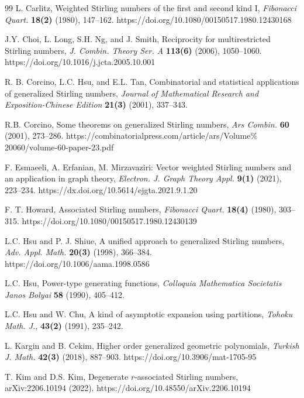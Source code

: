 \documentclass[12pt, reqno]{amsart}
\newtheorem{proof 1}{proof 1}
\begin{document}
\begin{thebibliography}{99}
 L. Carlitz, Weighted {S}tirling numbers of the first and second kind I, \textit{Fibonacci Quart.} \textbf{18(2)} (1980), 147--162. https://doi.org/10.1080/00150517.1980.12430168

 J.Y. Choi, L. Long, S.H. Ng, and J. Smith, Reciprocity for multirestricted Stirling numbers, \textit{J. Combin. Theory Ser. A} \textbf{113(6)} (2006), 1050--1060. https://doi.org/10.1016/j.jcta.2005.10.001

  R. B. Corcino, L.C. Hsu, and E.L. Tan, Combinatorial and statistical applications of generalized Stirling numbers, \textit{Journal of Mathematical Research and Exposition-Chinese Edition} \textbf{21(3)} (2001), 337--343. 
 
  R.B. Corcino, Some theorems on generalized Stirling numbers, \textit{Ars Combin.} \textbf{60} (2001), 273--286. https://combinatorialpress.com/article/ars/Volume$\%$20060/volume-60-paper-23.pdf

 F. Esmaeeli, A. Erfanian, M. Mirzavaziri: Vector weighted Stirling numbers and an application in graph theory, \textit{Electron. J. Graph Theory Appl.} \textbf{9(1)} (2021), 223--234. https://dx.doi.org/10.5614/ejgta.2021.9.1.20

  F. T. Howard, Associated Stirling numbers, \textit{Fibonacci Quart.} \textbf{18(4)}  (1980), 303--315. https://doi.org/10.1080/00150517.1980.12430139
 
  L.C. Hsu and P. J. Shiue, A unified approach to generalized Stirling numbers, \textit{Adv. Appl. Math.} \textbf{20(3)} (1998), 366--384.  https://doi.org/10.1006/aama.1998.0586
 
  L.C. Hsu,  Power-type generating functions,  \textit{Colloquia Mathematica Societatis Janos Bolyai} \textbf{58} (1990), 405--412. 
 
  L.C. Hsu and W. Chu, A kind of asymptotic expansion using partitions, \textit{Tohoku Math. J.}, \textbf{43(2)} (1991), 235--242. 
 
 L. Kargin and B. Cekim, Higher order generalized geometric polynomials, \textit{Turkish J. Math.} \textbf{42(3)} (2018), 887--903. https://doi.org/10.3906/mat-1705-95

  T. Kim and D.S. Kim, Degenerate $r$-associated Stirling numbers, arXiv:2206.10194 (2022). https://doi.org/10.48550/arXiv.2206.10194


\end{thebibliography}
\end{document}
